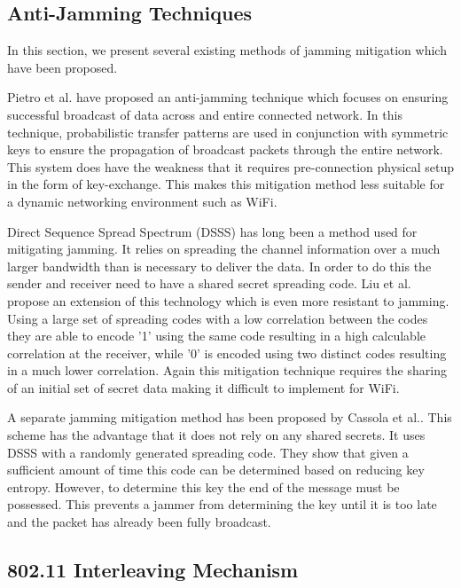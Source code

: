 \documentclass[sigconf]{acmart}
\begin{document}
\subsection{Anti-Jamming Techniques}
\label{sec:anti_jamming}

In this section, we present several existing methods of jamming mitigation which have been proposed.

Pietro et al. have proposed an anti-jamming technique which focuses on ensuring successful broadcast of data across and entire connected network\cite{di2015freedom}. In this technique, probabilistic transfer patterns are used in conjunction with symmetric keys to ensure the propagation of broadcast packets through the entire network. This system does have the weakness that it requires pre-connection physical setup in the form of key-exchange. This makes this mitigation method less suitable for a dynamic networking environment such as WiFi.

Direct Sequence Spread Spectrum (DSSS) has long been a method used for mitigating jamming. It relies on spreading the channel information over a much larger bandwidth than is necessary to deliver the data. In order to do this the sender and receiver need to have a shared secret spreading code. Liu et al. propose an extension of this technology which is even more resistant to jamming\cite{liu2010randomized}. Using a large set of spreading codes with a low correlation between the codes they are able to encode '1' using the same code resulting in a high calculable correlation at the receiver, while '0' is encoded using two distinct codes resulting in a much lower correlation. Again this mitigation technique requires the sharing of an initial set of secret data making it difficult to implement for WiFi.

A separate jamming mitigation method has been proposed by Cassola et al.\cite{cassola2012efficient}. This scheme has the advantage that it does not rely on any shared secrets. It uses DSSS with a randomly generated spreading code. They show that given a sufficient amount of time this code can be determined based on reducing key entropy. However, to determine this key the end of the message must be possessed. This prevents a jammer from determining the key until it is too late and the packet has already been fully broadcast. 

\subsection{802.11 Interleaving Mechanism}
\label{sub:interleavingMech}
\end{document}
